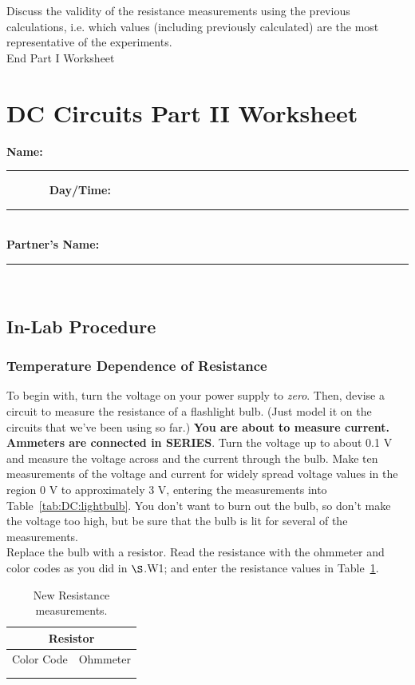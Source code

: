 \noindent Discuss the validity of the resistance measurements using the 
previous calculations, i.e. which values (including previously calculated) 
are the most representative of the experiments. \\
\vfill
{\Large End Part I Worksheet}

\newpage

\renewcommand{\thesection}{\thechapter.W2}

\section{DC Circuits Part II Worksheet}


{\bf \Large Name:}~ \rule{5cm}{.1mm}~~~~~~~
{\bf \Large Day/Time:}~\rule{3cm}{.1mm}\\
{\bf \Large Partner's Name:}~\rule{6cm}{.1mm}\\
\subsection{In-Lab Procedure}
\subsubsection{Temperature Dependence of Resistance}
\label{sec:DC:tdep}
To begin with, turn the voltage on your power supply to {\it zero}.
Then, devise a circuit to measure the resistance of a flashlight bulb. (Just 
model it on the circuits that we've been using so far.) 
{\bf You are about
to measure current.  Ammeters are connected in SERIES}.  Turn the voltage up to
about 0.1 V and measure the voltage across and the current through the bulb. 
Make ten measurements of the voltage and current for widely 
spread voltage values in the region 0 V to approximately 3 V, entering
the measurements into Table~\ref{tab:DC:lightbulb}.  You don't want 
to burn out the bulb, so don't make the voltage too high, but be sure that the 
bulb is lit for several of the measurements.  \\

\noindent Replace the bulb with a resistor.
Read the resistance with the ohmmeter and color codes as you did in 
$\S${\thechapter.W1}; and enter the resistance values in Table~\ref{tab:DC:newres}.  
\begin{table}[htb]
\begin{center}
\begin{tabular}{|c|c|}
\hline
\multicolumn{2}{|c|}{Resistor } \\
\hline 
Color Code & Ohmmeter \\ 
\hline
\hspace*{3cm} & \hspace*{3cm}  \\ 
&   \\ 
\hline
\end{tabular}
\end{center}
\caption{New Resistance measurements.}
\label{tab:DC:newres}
\end{table}

